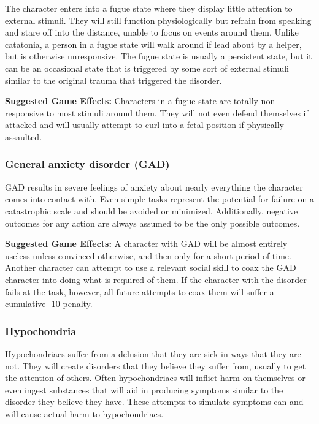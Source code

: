 The character enters into a fugue state where they display little attention to external stimuli. They will still function physiologically but refrain from speaking and stare off into the distance, unable to focus on events around them. Unlike catatonia, a person in a fugue state will walk around if lead about by a helper, but is otherwise unresponsive. The fugue state is usually a persistent state, but it can be an occasional state that is triggered by some sort of external stimuli similar to the original trauma that triggered the disorder.

\textbf{Suggested Game Effects:} Characters in a fugue state are totally non-responsive to most stimuli around them. They will not even defend themselves if attacked and will usually attempt to curl into a fetal position if physically assaulted.

\subsubsection{General anxiety disorder (GAD)}

GAD results in severe feelings of anxiety about nearly everything the character comes into contact with. Even simple tasks represent the potential for failure on a catastrophic scale and should be avoided or minimized. Additionally, negative outcomes for any action are always assumed to be the only possible outcomes.

\textbf{Suggested Game Effects:} A character with GAD will be almost entirely useless unless convinced otherwise, and then only for a short period of time. Another character can attempt to use a relevant social skill to coax the GAD character into doing what is required of them. If the character with the disorder fails at the task, however, all future attempts to coax them will suffer a cumulative -10 penalty.

\subsubsection{Hypochondria}

Hypochondriacs suffer from a delusion that they are sick in ways that they are not. They will create disorders that they believe they suffer from, usually to get the attention of others. Often hypochondriacs will inflict harm on themselves or even ingest substances that will aid in producing symptoms similar to the disorder they believe they have. These attempts to simulate symptoms can and will cause actual harm to hypochondriacs.

